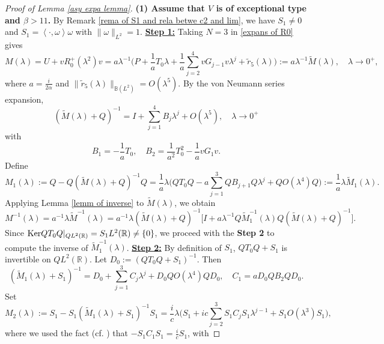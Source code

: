 \documentclass[reqno]{amsart}
\newcommand\R{\mathbb{R}}
\newcommand\B{\mathbb{B}}
\numberwithin{equation}{section}
\begin{document}
\begin{proof}[Proof of Lemma {\rm\ref{asy expa lemma}}]
{\bf(1) Assume that $V$ is of exceptional type and $\beta>11$.} By Remark \ref{rema of S1 and rela betwe c2 and lim}, we have $S_1\neq0$ and $S_1=\left<\cdot,\omega\right>\omega$ with $\|\omega\|_{L^2}=1$. 
\vskip0.2cm
\underline{\bf Step 1:} Taking $N=3$ in \eqref{expans of R0} gives
\begin{equation*}
M(\lambda)=U+vR^{+}_0(\lambda^2)v=a\lambda^{-1}\Big(P+\frac{1}{a}T_0\lambda+\frac{1}{a}\sum\limits_{j=2}^{4}vG_{j-1}v\lambda^j+\widetilde{r}_5(\lambda)\Big):=a\lambda^{-1}\widetilde{M}(\lambda),\quad \lambda\rightarrow0^+,
\end{equation*}
where $a=\frac{i}{2\alpha}$ and $\|\widetilde{r}_5(\lambda)\|_{\B(L^2)}=O(\lambda^5)$. By the von Neumann series expansion,
\begin{equation}\label{inverse of M+Q}
    (\widetilde{M}(\lambda)+Q)^{-1}=I+\sum\limits_{j=1}^{4}B_j\lambda^j
+O(\lambda^5),\quad \lambda
\rightarrow0^+
\end{equation}
with
\begin{equation*}
    B_1=-\frac{1}{a}T_0,\quad B_2=\frac{1}{a^2}T_0^2-\frac{1}{a}vG_1v.
\end{equation*}
Define $$M_1(\lambda):=Q-Q(\widetilde{M}(\lambda)+Q)^{-1}Q=\frac{1}{a}\lambda \Big(QT_0Q-a\sum\limits_{j=1}^3QB_{j+1}Q\lambda^j+QO(\lambda^4)Q\Big):=\frac{1}{a}\lambda \widetilde{M}_1(\lambda).$$ Applying Lemma \ref{lemm of inverse} to $\widetilde{M}(\lambda)$, we obtain
\begin{equation}\label{inverse of M}
    M^{-1}(\lambda)=a^{-1}\lambda\widetilde{M}^{-1}(\lambda)=a^{-1}\lambda(\widetilde{M}(\lambda)+Q)^{-1}\Big[I+a\lambda^{-1}Q\widetilde{M}^{-1}_1(\lambda)Q(\widetilde{M}(\lambda)+Q)^{-1}\Big].
\end{equation}
Since ${\rm Ker}QT_0Q|_{QL^2(\R)}=S_1L^2(\R)\neq\{0\}$, we proceed with the {\bf Step 2} to compute the inverse of $\widetilde{M}^{-1}_1(\lambda)$.
\vskip0.2cm
\underline{\bf Step 2:} By definition of $S_1$,  $QT_0Q+S_1$ is invertible on $QL^2(\R)$. Let $D_0:=(QT_0Q+S_1)^{-1}$. Then 
\begin{equation}\label{inverse of M1+S1}
(\widetilde{M}_1(\lambda)+S_1)^{-1}=D_0+\sum\limits_{j=1}^3C_j\lambda^j+D_0QO(\lambda^4)QD_0,\quad C_1=aD_0QB_2QD_0.
\end{equation}
Set $$M_2(\lambda):=S_1-S_1(\widetilde{M}_1(\lambda)+S_1)^{-1}S_1=\frac{i}{c}\lambda\Big(S_1+ic\sum\limits_{j=2}^{3}S_1C_jS_1\lambda^{j-1}+S_1O(\lambda^3)S_1\Big),$$
where we used the fact (cf. \cite[Lemma 5.4]{JN01}) that $-S_1C_1S_1=\frac{i}{c}S_1$, with 

\end{proof}
\end{document}
